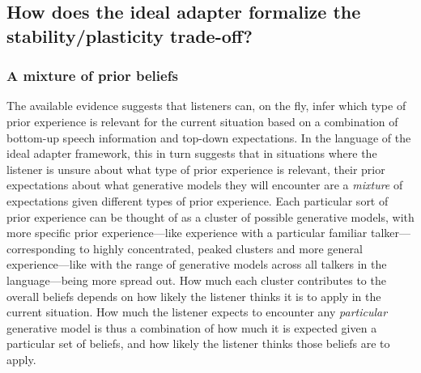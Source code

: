 \subsection{How does the ideal adapter formalize the stability/plasticity trade-off?}
\label{sec:how-does-ideal}

\subsubsection{A mixture of prior beliefs}
\label{sec:mixt-prior-beli}

The available evidence suggests that listeners can, on the fly, infer which type of prior experience is relevant for the current situation based on a combination of bottom-up speech information and top-down expectations.  In the language of the ideal adapter framework, this in turn suggests that in situations where the listener is unsure about what type of prior experience is relevant, their prior expectations about what generative models they will encounter are a \emph{mixture} of expectations given different types of prior experience.  Each particular sort of prior experience can be thought of as a cluster of possible generative models, with more specific prior experience---like experience with a particular familiar talker---corresponding to highly concentrated, peaked clusters and more general experience---like with the range of generative models across all talkers in the language---being more spread out.  
How much each cluster contributes to the overall beliefs depends on how likely the listener thinks it is to apply in the current situation.  How much the listener expects to encounter any \emph{particular} generative model is thus a combination of how much it is expected given a particular set of beliefs, and how likely the listener thinks those beliefs are to apply.  


